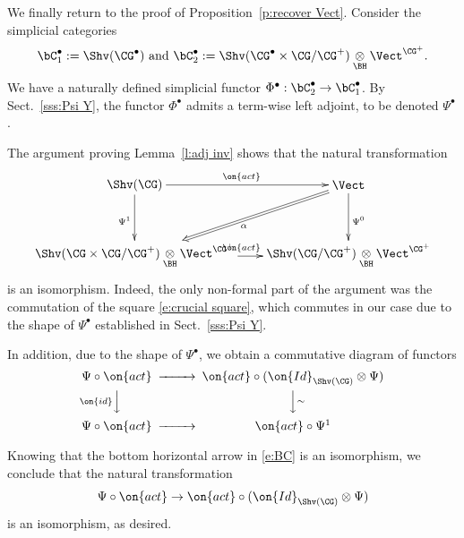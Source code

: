 \documentclass[9pt]{amsart}
\theoremstyle{definition}
\theoremstyle{remark}
\newcommand{\secref}[1]{Sect.~\ref{#1}}
\newcommand{\lemref}[1]{Lemma~\ref{#1}}
\newcommand{\propref}[1]{Proposition~\ref{#1}}
\numberwithin{equation}{section}
\begin{document}
\sssec{}

We finally return to the proof of \propref{p:recover Vect}.  Consider the simplicial categories
$$\bC^\bullet_1:=\Shv(\CG^\bullet) \text{ and }  \bC^\bullet_2:=\Shv(\CG^\bullet\times \CG/\CG^+)\underset{\BH}\otimes \Vect^{\CG^+}.$$
We have a naturally defined simplicial functor $\Phi^\bullet:\bC_2^\bullet\to \bC_1^\bullet$. By \secref{sss:Psi Y}, the functor $\Phi^\bullet$
admits a term-wise left adjoint, to be denoted $\Psi^\bullet$.

\medskip

The argument proving \lemref{l:adj inv} shows that the natural transformation
$$
\xy
(0,0)*+{\Shv(\CG)}="A";
(60,0)*+{\Vect}="B";
(0,-20)*+{\Shv(\CG\times \CG/\CG^+)\underset{\BH}\otimes \Vect^{\CG^+}}="C";
(60,-20)*+{\Shv(\CG/\CG^+)\underset{\BH}\otimes \Vect^{\CG^+}}="D";
{\ar@{->}_{\Psi^1} "A";"C"};
{\ar@{->}^{\on{act}}"A";"B"};
{\ar@{->}^{\on{act}} "C";"D"};
{\ar@{->}^{\Psi^0} "B";"D"};
{\ar@{=>}^\alpha "B";"C"};
\endxy
$$
is an isomorphism. Indeed, the only non-formal part of the argument was the commutation of the square \eqref{e:crucial square},
which commutes in our case due to the shape of $\Psi^\bullet$ established in \secref{sss:Psi Y}. 

\medskip

In addition, due to the shape of $\Psi^\bullet$, we obtain a commutative diagram of functors
\begin{equation} \label{e:BC} 
\CD
\Psi\circ \on{act}  @>>> \on{act}\circ (\on{Id}_{\Shv(\CG)}\otimes \Psi) \\
@V{\on{id}}VV  @VV{\sim}V  \\
\Psi\circ \on{act}  @>>>  \on{act}\circ \Psi^1
\endCD
\end{equation}

Knowing that the bottom horizontal arrow in \eqref{e:BC} is an isomorphism, we conclude that the natural
transformation
$$\Psi\circ \on{act}  \to \on{act}\circ (\on{Id}_{\Shv(\CG)}\otimes \Psi)$$
is an isomorphism, as desired. 
\end{document}
